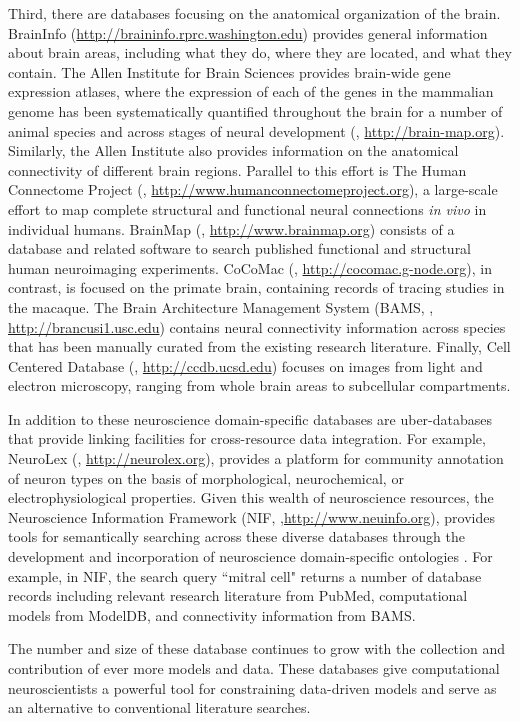 \documentclass[12pt]{article}
\begin{document}
Third, there are databases focusing on the anatomical organization of the brain.  
BrainInfo (\url{http://braininfo.rprc.washington.edu}) provides general information about brain areas, including what they do, where they are located, and what they contain.  
The Allen Institute for Brain Sciences provides brain-wide gene expression atlases, where the expression of each of the genes in the mammalian genome has been systematically quantified throughout the brain for a number of animal species and across stages of neural development (\cite{lein_genome-wide_2007}, \url{http://brain-map.org}). 
Similarly, the Allen Institute also provides information on the anatomical connectivity of different brain regions.
Parallel to this effort is The Human Connectome Project (\cite{humanconnectomeproject_2013}, \url{http://www.humanconnectomeproject.org}), a large-scale effort to map complete structural and functional neural connections \textit{in vivo} in individual humans. 
BrainMap (\cite{brainmap_2005}, \url{http://www.brainmap.org}) consists of a database and related software to search published functional and structural human neuroimaging experiments.  
CoCoMac (\cite{cocomac_2001,cocomac_2012}, \url{http://cocomac.g-node.org}), in contrast, is focused on the primate brain, containing records of tracing studies in the macaque. 
The Brain Architecture Management System (BAMS, \cite{bota_brain_2005}, \url{http://brancusi1.usc.edu}) contains neural connectivity information across species that has been manually curated from the existing research literature.  
Finally, Cell Centered Database (\cite{cellcentered_2003,cellcentered_2009}, \url{http://ccdb.ucsd.edu}) focuses on images from light and electron microscopy, ranging from whole brain areas to subcellular compartments.  

In addition to these neuroscience domain-specific databases are uber-databases that provide linking facilities for cross-resource data integration. 
For example, NeuroLex (\cite{larson_neurolex.org:_2013}, \url{http://neurolex.org}), provides a platform for community annotation of neuron types on the basis of morphological, neurochemical, or electrophysiological properties. 
Given this wealth of neuroscience resources, the Neuroscience Information Framework (NIF, \cite{gardner_neuroscience_2008},\url{http://www.neuinfo.org}), provides tools for semantically searching across these diverse databases through the development and incorporation of neuroscience domain-specific ontologies \cite{bug_nifstd_2008,larson_ontologies_2009,hamilton_ontological_2012,imam_development_2012}. 
For example, in NIF, the search query ``mitral cell" returns a number of database records including relevant research literature from PubMed, computational models from ModelDB, and connectivity information from BAMS.  

The number and size of these database continues to grow with the collection and contribution of ever more models and data.  
These databases give computational neuroscientists a powerful tool for constraining data-driven models and serve as an alternative to conventional literature searches.  


\end{document}
